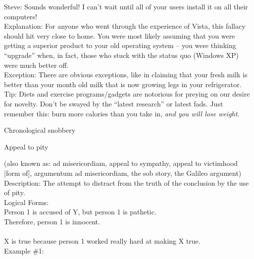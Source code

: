 \documentclass[a4paper,12pt,single,pdftex]{scrbook}
\begin{document}
{    
      Steve: Sounds wonderful!  I can’t wait until all of your users install it on all their computers!
    \\

    
      Explanation: For anyone who went through the experience of Vista, this fallacy should hit very close to home.  You were most likely assuming that you were getting a superior product to your old operating system -- you were thinking “upgrade” when, in fact, those who stuck with the status quo (Windows XP) were much better off.
    \\

    
      Exception: There are obvious exceptions, like in claiming that your fresh milk is better than your month old milk that is now growing legs in your refrigerator.
    \\

    
      Tip: Diets and exercise programs/gadgets are notorious for preying on our desire for novelty.  Don’t be swayed by the “latest research” or latest fads.  Just remember this: burn more calories than you take in, {\it and you will lose weight}.
    \\

  }


Chronological snobbery

Appeal to pity
    
      (also known as: ad misericordiam, appeal to sympathy, appeal to victimhood [form of], argumentum ad misericordiam, the sob story, the Galileo argument)
    \\

  
    
      Description: The attempt to distract from the truth of the conclusion by the use of pity.
    \\

    
      Logical Forms:
    \\

    
      Person 1 is accused of Y, but person 1 is pathetic.
    \\

    
      Therefore, person 1 is innocent.
    \\

    
       
    \\

    
      X is true because person 1 worked really hard at making X true.
    \\

    
      Example \#1:
    \\
\end{document}
